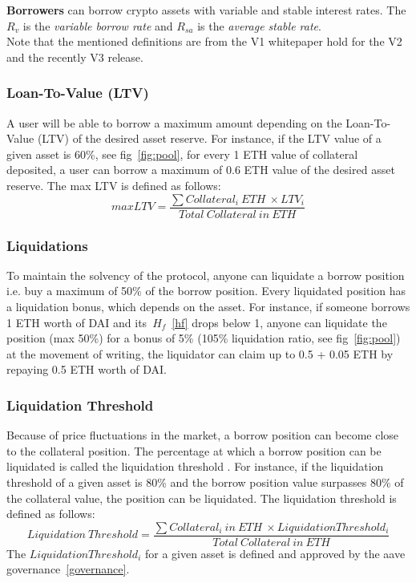 \documentclass[11pt,a4paper]{report}
\begin{document}
\textbf{Borrowers} can borrow crypto assets with variable and stable interest rates. 
The $R_{v}$\cite{aaveV1RV} is the \textit{variable borrow rate} and $R_{sa}$\cite{aaveV1RS} is the \textit{average stable rate}. \\

Note that the mentioned definitions are from the V1\cite{aaveV1} whitepaper hold for the V2\cite{aaveV2} and the recently V3\cite{aaveV3} release.

\subsubsection{Loan-To-Value (LTV)} 
A user will be able to borrow a maximum amount depending on the Loan-To-Value (LTV)\cite{aaveV1}\cite{risk} of the desired asset reserve. For instance, if the LTV value of a given asset is  60\%, see fig~\ref{fig:pool}, for every 1 ETH value of collateral deposited, a user can borrow a maximum of 0.6 ETH value of the desired asset reserve. The max LTV is defined as follows:\[ maxLTV = \frac{\sum Collateral_{i}~ETH~\times LTV_{i}}{Total~Collateral~in~ETH} \]
\subsubsection{Liquidations}\cite{aaveV1}\cite{liquidation} 
To maintain the solvency of the protocol, anyone can liquidate a borrow position i.e. buy a maximum of 50\% of the borrow position. Every liquidated position has a liquidation bonus, which depends on the asset. For instance, if someone borrows 1 ETH worth of DAI and its~$H_{f}$~\ref{hf} drops below 1, anyone can liquidate the position (max 50\%) for a bonus of 5\% (105\% liquidation ratio, see fig~\ref{fig:pool}) at the movement of writing, the liquidator can claim up to 0.5 + 0.05 ETH by repaying 0.5 ETH worth of DAI.
\subsubsection{Liquidation Threshold}
Because of price fluctuations in the market, a borrow position can become close to the collateral position. The percentage at which a borrow position can be liquidated is called the liquidation threshold\cite{aaveV1}\cite{risk} . For instance, if the liquidation threshold of a given asset is 80\% and the borrow position value surpasses 80\% of the collateral value, the position can be liquidated. The liquidation threshold is defined as follows:
\[ Liquidation~Threshold = \frac{\sum Collateral_{i}~in~ETH~\times Liquidation Threshold_{i}}{Total~Collateral~in~ETH} \]
The $Liquidation Threshold_{i}$ for a given asset is defined and approved by the aave governance~\ref{governance}.
\end{document}
